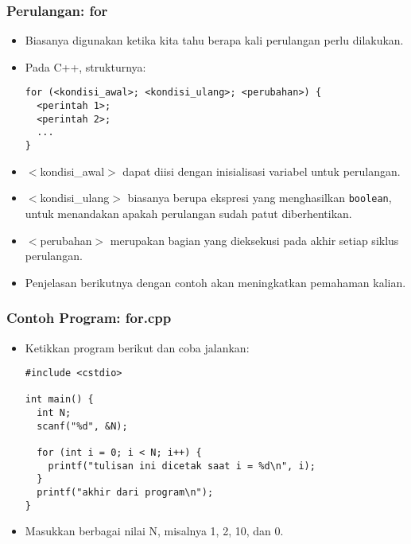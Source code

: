 \begin{frame}[fragile]
\frametitle{Perulangan: for}
\begin{itemize}
  \item Biasanya digunakan ketika kita tahu berapa kali perulangan perlu dilakukan.
  \item Pada C++, strukturnya:
\begin{lstlisting}
for (<kondisi_awal>; <kondisi_ulang>; <perubahan>) {
  <perintah 1>;
  <perintah 2>;
  ...
}
\end{lstlisting}
  \item $<$kondisi\_awal$>$ dapat diisi dengan inisialisasi variabel untuk perulangan.
  \item $<$kondisi\_ulang$>$ biasanya berupa ekspresi yang menghasilkan \texttt{boolean}, untuk menandakan apakah perulangan sudah patut diberhentikan.
  \item $<$perubahan$>$ merupakan bagian yang dieksekusi pada akhir setiap siklus perulangan.
  \item Penjelasan berikutnya dengan contoh akan meningkatkan pemahaman kalian.
\end{itemize}
\end{frame}

\begin{frame}[fragile]
\frametitle{Contoh Program: for.cpp}
\begin{itemize}
  \item Ketikkan program berikut dan coba jalankan:
\begin{lstlisting}
#include <cstdio>

int main() {
  int N;
  scanf("%d", &N);

  for (int i = 0; i < N; i++) {
    printf("tulisan ini dicetak saat i = %d\n", i);
  }
  printf("akhir dari program\n");
}
\end{lstlisting}
  \item Masukkan berbagai nilai N, misalnya 1, 2, 10, dan 0.
\end{itemize}
\end{frame}

